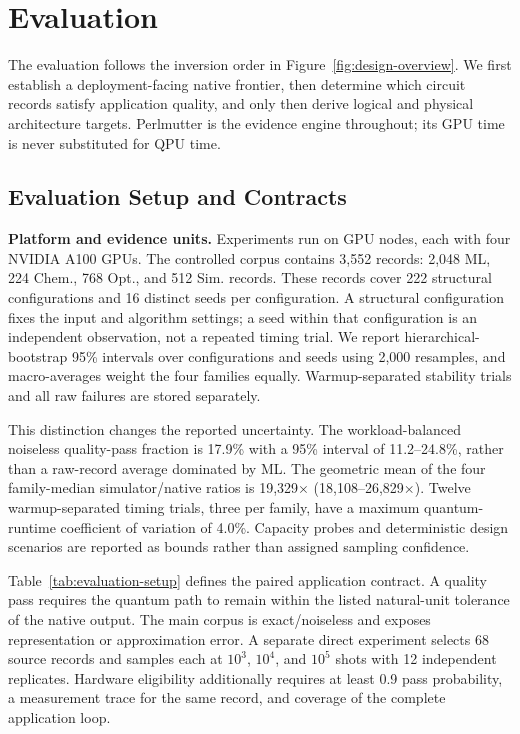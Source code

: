 \section{Evaluation}

The evaluation follows the inversion order in Figure~\ref{fig:design-overview}. We first establish a deployment-facing native frontier, then determine which circuit records satisfy application quality, and only then derive logical and physical architecture targets. Perlmutter is the evidence engine throughout; its GPU time is never substituted for QPU time.

\subsection{Evaluation Setup and Contracts}

\noindent\textbf{Platform and evidence units.}
Experiments run on \LeadershipSystem GPU nodes, each with four NVIDIA A100 GPUs. The controlled corpus contains 3,552 records: 2,048 ML, 224 Chem., 768 Opt., and 512 Sim. records. These records cover 222 structural configurations and 16 distinct seeds per configuration. A structural configuration fixes the input and algorithm settings; a seed within that configuration is an independent observation, not a repeated timing trial. We report hierarchical-bootstrap 95\% intervals over configurations and seeds using 2,000 resamples, and macro-averages weight the four families equally. Warmup-separated stability trials and all raw failures are stored separately.

This distinction changes the reported uncertainty. The workload-balanced noiseless quality-pass fraction is 17.9\% with a 95\% interval of 11.2--24.8\%, rather than a raw-record average dominated by ML. The geometric mean of the four family-median simulator/native ratios is 19,329$\times$ (18,108--26,829$\times$). Twelve warmup-separated timing trials, three per family, have a maximum quantum-runtime coefficient of variation of 4.0\%. Capacity probes and deterministic design scenarios are reported as bounds rather than assigned sampling confidence.

Table~\ref{tab:evaluation-setup} defines the paired application contract. A quality pass requires the quantum path to remain within the listed natural-unit tolerance of the native output. The main corpus is exact/noiseless and exposes representation or approximation error. A separate direct experiment selects 68 source records and samples each at $10^3$, $10^4$, and $10^5$ shots with 12 independent replicates. Hardware eligibility additionally requires at least 0.9 pass probability, a measurement trace for the same record, and coverage of the complete application loop.

